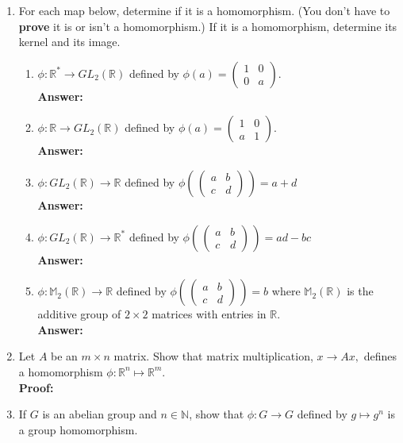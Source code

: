 \documentclass[12pt]{article}
\renewcommand{\emph}[1]{\textsf{\textbf{#1}}}
\newcommand{\bbN}{\mathbb{N}}
\newcommand{\bbR}{\mathbb{R}}
\begin{document}
\begin{enumerate}
\newpage
\item For each map below, determine if it is a homomorphism. (You don't have to \emph{prove} it is or isn't a homomorphism.) If it is a homomorphism, determine its kernel and its image.
	\begin{enumerate}
	\item $\phi: \bbR^* \to GL_2(\bbR)$ defined by $\phi(a)= \begin{pmatrix} 1&0\\0&a \end{pmatrix}.$\\
	\textbf{Answer:}
	\vfill
	\item $\phi: \bbR \to GL_2(\bbR)$ defined by $\phi(a)= \begin{pmatrix} 1&0\\a&1 \end{pmatrix}.$\\
	\textbf{Answer:}
	\vfill
	\item $\phi: GL_2(\bbR) \to  \bbR $ defined by $\phi\left( \, \begin{pmatrix} a&b\\c&d \end{pmatrix} \,\right) =a+d$\\
	\textbf{Answer:}
	\vfill
	\item $\phi: GL_2(\bbR) \to  \bbR^* $ defined by $\phi\left( \, \begin{pmatrix} a&b\\c&d \end{pmatrix} \,\right) =ad-bc$\\
	\textbf{Answer:}
	\vfill
	\item $\phi: \mathbb{M}_2(\bbR) \to  \bbR$ defined by $\phi\left( \, \begin{pmatrix} a&b\\c&d \end{pmatrix} \,\right) =b$ where $\mathbb{M}_2(\bbR)$ is the additive group of $2 \times 2$ matrices with entries in $\bbR.$\\
	\textbf{Answer:}
	\vfill
	\end{enumerate}
\newpage
\item Let $A$ be an $m \times n$ matrix. Show that matrix multiplication, $x \to Ax,$ defines a homomorphism $\phi: \bbR^n \mapsto \bbR^m.$\\

\textbf{Proof:}
	\vfill
	
\item If $G$ is an abelian group and $n \in \bbN$, show that $\phi: G \to G$ defined by $g \mapsto g^n$ is a group homomorphism.\\


\end{enumerate}
\end{document}
